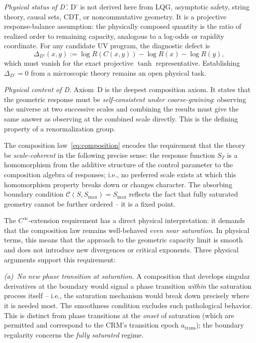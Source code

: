\documentclass[aps,prd,twocolumn,superscriptaddress,nofootinbib]{revtex4-2}
\begin{document}
\textit{Physical status of D'.} D' is not derived here from LQG, asymptotic safety, string theory, causal sets, CDT, or noncommutative geometry. It is a projective response-balance assumption: the physically composed quantity is the ratio of realized order to remaining capacity, analogous to a log-odds or rapidity coordinate. For any candidate UV program, the diagnostic defect is
\[
  \Delta_{D'}(x,y):=\log R(C(x,y))-\log R(x)-\log R(y),
\]
which must vanish for the exact projective $\tanh$ representative. Establishing $\Delta_{D'}=0$ from a microscopic theory remains an open physical task.

\textit{Physical content of D.} Axiom~D is the deepest composition axiom. It states that the geometric response must be \textit{self-consistent under coarse-graining}: observing the universe at two successive scales and combining the results must give the same answer as observing at the combined scale directly. This is the defining property of a renormalization group.

The composition law~\eqref{eq:composition} encodes the requirement that the theory be \textit{scale-coherent} in the following precise sense: the response function $S_T$ is a homomorphism from the additive structure of the control parameter to the composition algebra of responses; i.e., no preferred scale exists at which this homomorphism property breaks down or changes character. The absorbing boundary condition $\mathcal{C}(S, S_{\max}) = S_{\max}$ reflects the fact that fully saturated geometry cannot be further ordered -- it is a fixed point.

The $C^\infty$-extension requirement has a direct physical interpretation: it demands that the composition law remains well-behaved \textit{even near saturation}. In physical terms, this means that the approach to the geometric capacity limit is smooth and does not introduce new divergences or critical exponents. Three physical arguments support this requirement:

\textit{(a)~No new phase transition at saturation.} A composition that develops singular derivatives at the boundary would signal a phase transition \textit{within} the saturation process itself -- i.e., the saturation mechanism would break down precisely where it is needed most. The smoothness condition excludes such pathological behavior. This is distinct from phase transitions at the \textit{onset} of saturation (which are permitted and correspond to the CRM's transition epoch $a_{\mathrm{trans}}$); the boundary regularity concerns the \textit{fully saturated} regime.
\end{document}
